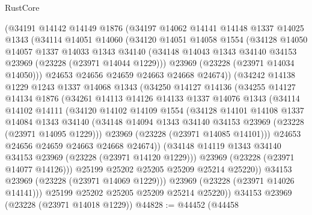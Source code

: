 \begin{lexlean}{RustCore}
\begin{coremodule}
      (@34191
        @14142
        @14149
        @1876
        (@34197
          @14062
          @14141
          @14148
          @1337
          @14025
          @1343
          (@34114
            @14051
            @14060
            (@34120
              @14051
              @14058
              @1554
              (@34128
                @14050
                @14057
                @1337
                @14033
                @1343
                @34140
                (@34148 @14043 @1343 @34140 @34153 @23969 (@23228 (@23971 @14044 @1229)))
                @23969
                (@23228 (@23971 @14034 @14050)))
              @24653
              @24656
              @24659
              @24663
              @24668
              @24674))
          (@34242
            @14138
            @1229
            @1243
            @1337
            @14068
            @1343
            (@34250
              @14127
              @14136
              (@34255
                @14127
                @14134
                @1876
                (@34261
                  @14113
                  @14126
                  @14133
                  @1337
                  @14076
                  @1343
                  (@34114
                    @14102
                    @14111
                    (@34120
                      @14102
                      @14109
                      @1554
                      (@34128
                        @14101
                        @14108
                        @1337
                        @14084
                        @1343
                        @34140
                        (@34148 @14094 @1343 @34140 @34153 @23969 (@23228 (@23971 @14095 @1229)))
                        @23969
                        (@23228 (@23971 @14085 @14101)))
                      @24653
                      @24656
                      @24659
                      @24663
                      @24668
                      @24674))
                  (@34148 @14119 @1343 @34140 @34153 @23969 (@23228 (@23971 @14120 @1229)))
                  @23969
                  (@23228 (@23971 @14077 @14126)))
                @25199
                @25202
                @25205
                @25209
                @25214
                @25220))
            @34153
            @23969
            (@23228 (@23971 @14069 @1229)))
          @23969
          (@23228 (@23971 @14026 @14141)))
        @25199
        @25202
        @25205
        @25209
        @25214
        @25220))
    @34153
    @23969
    (@23228 (@23971 @14018 @1229))
@44828 := @44452
    (@44458

\end{coremodule}
\end{lexlean}
